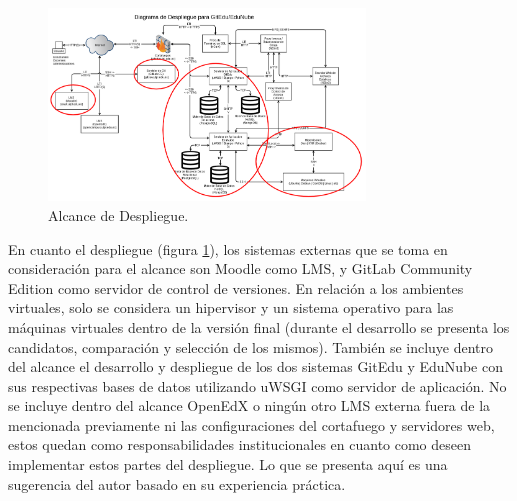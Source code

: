 \begin{figure}
  \begin{center}
    \includegraphics[width=0.75\textwidth]{Figures/alc_desp_ge_en.png}
  \end{center}
  \caption{Alcance de Despliegue.}
  \label{alc_desp_ge_en}
\end{figure}

En cuanto el despliegue (figura \ref{alc_desp_ge_en}), los sistemas externas que se toma en consideración para el alcance son Moodle como LMS, y GitLab Community Edition como servidor de control de versiones. En relación a los ambientes virtuales, solo se considera un hipervisor y un sistema operativo para las máquinas virtuales dentro de la versión final (durante el desarrollo se presenta los candidatos, comparación y selección de los mismos). También se incluye dentro del alcance el desarrollo y despliegue de los dos sistemas GitEdu y EduNube con sus respectivas bases de datos utilizando uWSGI como servidor de aplicación. No se incluye dentro del alcance OpenEdX o ningún otro LMS externa fuera de la mencionada previamente ni las configuraciones del cortafuego y servidores web, estos quedan como responsabilidades institucionales en cuanto como deseen implementar estos partes del despliegue. Lo que se presenta aquí es una sugerencia del autor basado en su experiencia práctica.
